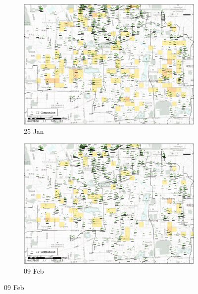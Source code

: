 \documentclass[preprints,ijgi,submit,moreauthors]{Definitions/mdpi}
\begin{document}
\begin{figure}[ht]
    \centering
    \begin{subfigure}{.334\textwidth}
        \includegraphics[width=\textwidth]{Figures/Relation_with_POIs/POI_compD2020_01_25.eps}
        \caption{25 Jan}
    \end{subfigure}
    \begin{subfigure}{.334\textwidth}
        \includegraphics[width=\textwidth]{Figures/Relation_with_POIs/POI_compD2020_02_09.eps}
        \caption{09 Feb}
    \end{subfigure}


\end{figure}
\end{document}

